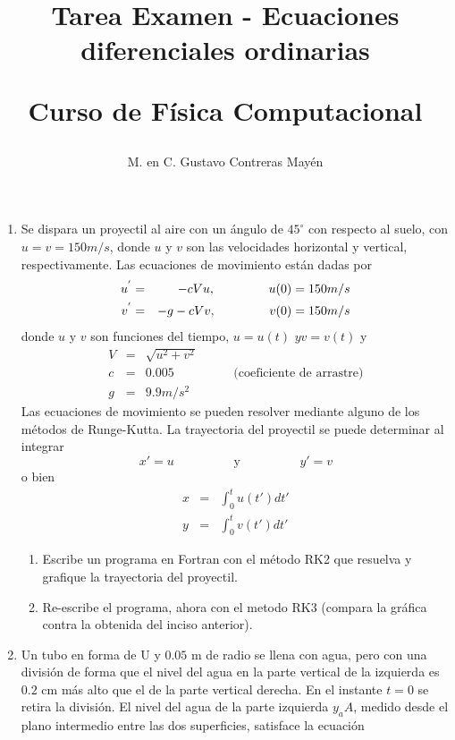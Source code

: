 \documentclass[letterpaper]{article}
\title{Tarea Examen - Ecuaciones diferenciales ordinarias \\ \begin{large}Curso de Física Computacional\end{large}}
\author{M. en C. Gustavo Contreras Mayén}
\date{ }
\begin{document}
\maketitle
\fontsize{14}{14}\selectfont
{}
\begin{enumerate}
\item Se dispara un proyectil al aire con un ángulo de $45^{\circ}$ con respecto al suelo, con $u=v=150 m/s$, donde $u$ y $v$ son las velocidades horizontal y vertical, respectivamente. Las ecuaciones de movimiento están dadas por
\begin{eqnarray*}
u^{'} & = & -c Vu, \hspace{1.5cm} u(0)=150 m/s \\
v^{'} & = & -g - cVv, \hspace{1.5cm} v(0)=150 m/s
\end{eqnarray*}
donde $u$ y $v$ son funciones del tiempo, $u=u(t)$ $y v=v(t)$ y
\begin{eqnarray*}
V & = & \sqrt{u^{2} + v^{2}} \\
c & = & 0.005 \hspace{2cm} \text{(coeficiente de arrastre)} \\
g & = & 9.9 m/s^{2}
\end{eqnarray*}
Las ecuaciones de movimiento se pueden resolver mediante alguno de los métodos de Runge-Kutta. La trayectoria del proyectil se puede determinar al integrar
\[ x' = u \hspace{2cm} \text{y} \hspace{2cm} y' = v \]
o bien
\begin{eqnarray*}
x & = & \int^{t}_{0} u(t') dt' \\
y & = & \int^{t}_{0} v(t') dt'
\end{eqnarray*}
\begin{enumerate}
\item Escribe un programa en Fortran con el método RK2 que resuelva y grafique la trayectoria del proyectil.
\item Re-escribe el programa, ahora con el metodo RK3 (compara la gr\'{a}fica contra la obtenida del inciso anterior).
\end{enumerate}
\item Un tubo en forma de U y $0.05$ m de radio se llena con agua, pero con una división de forma que el nivel del agua en la parte vertical de la izquierda es $0.2$ cm más alto que el de la parte vertical derecha. En el instante $t=0$ se retira la división. El nivel del agua de la parte izquierda $y_{a}A$, medido desde el plano intermedio entre las dos superficies, satisface la ecuación

\end{enumerate}
\end{document}
